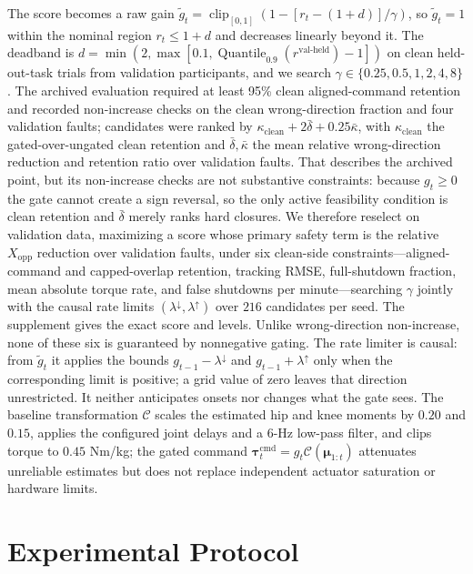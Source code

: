 \documentclass[letterpaper]{article} %
\begin{document}
The score becomes a raw gain $\widetilde g_t=\operatorname{clip}_{[0,1]}(1-[r_t-(1+d)]/\gamma)$, so $\widetilde g_t=1$ within the nominal region $r_t\leq1+d$ and decreases linearly beyond it.
The deadband is $d=\min(2,\max[0.1,\operatorname{Quantile}_{0.9}(r^{\mathrm{val\text{-}held}})-1])$ on clean held-out-task trials from validation participants, and we search $\gamma\in\{0.25,0.5,1,2,4,8\}$.
The archived evaluation required at least 95\% clean aligned-command retention and recorded non-increase checks on the clean wrong-direction fraction and four validation faults; candidates were ranked by $\kappa_{\mathrm{clean}}+2\bar\delta+0.25\bar\kappa$, with $\kappa_{\mathrm{clean}}$ the gated-over-ungated clean retention and $\bar\delta,\bar\kappa$ the mean relative wrong-direction reduction and retention ratio over validation faults.
That describes the archived point, but its non-increase checks are not substantive constraints: because $g_t\geq0$ the gate cannot create a sign reversal, so the only active feasibility condition is clean retention and $\bar\delta$ merely ranks hard closures.
We therefore reselect on validation data, maximizing a score whose primary safety term is the relative $X_{\mathrm{opp}}$ reduction over validation faults, under six clean-side constraints---aligned-command and capped-overlap retention, tracking RMSE, full-shutdown fraction, mean absolute torque rate, and false shutdowns per minute---searching $\gamma$ jointly with the causal rate limits $(\lambda^{\downarrow},\lambda^{\uparrow})$ over $216$ candidates per seed. The supplement gives the exact score and levels.
Unlike wrong-direction non-increase, none of these six is guaranteed by nonnegative gating.
The rate limiter is causal: from $\widetilde g_t$ it applies the bounds $g_{t-1}-\lambda^{\downarrow}$ and $g_{t-1}+\lambda^{\uparrow}$ only when the corresponding limit is positive; a grid value of zero leaves that direction unrestricted. It neither anticipates onsets nor changes what the gate sees.
The baseline transformation $\mathcal{C}$ scales the estimated hip and knee moments by $0.20$ and $0.15$, applies the configured joint delays and a 6-Hz low-pass filter, and clips torque to $0.45$ Nm/kg; the gated command $\boldsymbol{\tau}^{\mathrm{cmd}}_t=g_t\mathcal{C}(\boldsymbol{\mu}_{1:t})$ attenuates unreliable estimates but does not replace independent actuator saturation or hardware limits.

\section{Experimental Protocol}
\end{document}

